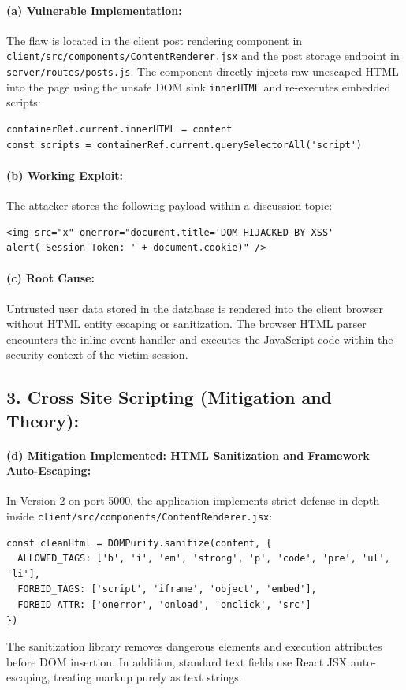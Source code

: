 \documentclass[11pt,a4paper]{article}
\begin{document}
\paragraph*{(a) Vulnerable Implementation:}
The flaw is located in the client post rendering component in \texttt{client/src/components/ContentRenderer.jsx} and the post storage endpoint in \texttt{server/routes/posts.js}. The component directly injects raw unescaped HTML into the page using the unsafe DOM sink \texttt{innerHTML} and re-executes embedded scripts:
\begin{lstlisting}
containerRef.current.innerHTML = content
const scripts = containerRef.current.querySelectorAll('script')
\end{lstlisting}

\paragraph*{(b) Working Exploit:}
The attacker stores the following payload within a discussion topic:
\begin{lstlisting}
<img src="x" onerror="document.title='DOM HIJACKED BY XSS'
alert('Session Token: ' + document.cookie)" />
\end{lstlisting}

\paragraph*{(c) Root Cause:}
Untrusted user data stored in the database is rendered into the client browser without HTML entity escaping or sanitization. The browser HTML parser encounters the inline event handler and executes the JavaScript code within the security context of the victim session.

\clearpage

\subsection*{3. Cross Site Scripting (Mitigation and Theory):}

\paragraph*{(d) Mitigation Implemented: HTML Sanitization and Framework Auto-Escaping:}
In Version 2 on port 5000, the application implements strict defense in depth inside \texttt{client/src/components/ContentRenderer.jsx}:
\begin{lstlisting}
const cleanHtml = DOMPurify.sanitize(content, {
  ALLOWED_TAGS: ['b', 'i', 'em', 'strong', 'p', 'code', 'pre', 'ul', 'li'],
  FORBID_TAGS: ['script', 'iframe', 'object', 'embed'],
  FORBID_ATTR: ['onerror', 'onload', 'onclick', 'src']
})
\end{lstlisting}
The sanitization library removes dangerous elements and execution attributes before DOM insertion. In addition, standard text fields use React JSX auto-escaping, treating markup purely as text strings.
\end{document}

